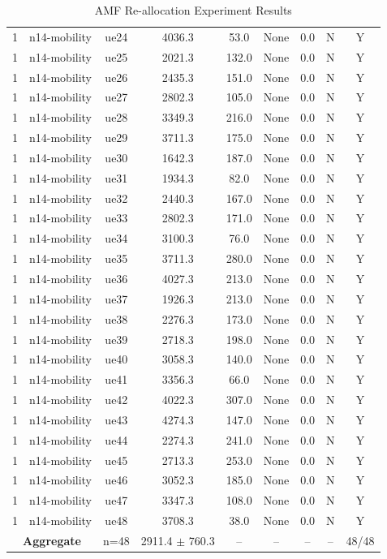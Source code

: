 \begin{table}[ht]
\begin{tabular}{|c|c|c|c|c|c|c|c|c|}
1 & n14-mobility & ue24 & 4036.3 & 53.0 & None & 0.0 & N & Y \\
1 & n14-mobility & ue25 & 2021.3 & 132.0 & None & 0.0 & N & Y \\
1 & n14-mobility & ue26 & 2435.3 & 151.0 & None & 0.0 & N & Y \\
1 & n14-mobility & ue27 & 2802.3 & 105.0 & None & 0.0 & N & Y \\
1 & n14-mobility & ue28 & 3349.3 & 216.0 & None & 0.0 & N & Y \\
1 & n14-mobility & ue29 & 3711.3 & 175.0 & None & 0.0 & N & Y \\
1 & n14-mobility & ue30 & 1642.3 & 187.0 & None & 0.0 & N & Y \\
1 & n14-mobility & ue31 & 1934.3 & 82.0 & None & 0.0 & N & Y \\
1 & n14-mobility & ue32 & 2440.3 & 167.0 & None & 0.0 & N & Y \\
1 & n14-mobility & ue33 & 2802.3 & 171.0 & None & 0.0 & N & Y \\
1 & n14-mobility & ue34 & 3100.3 & 76.0 & None & 0.0 & N & Y \\
1 & n14-mobility & ue35 & 3711.3 & 280.0 & None & 0.0 & N & Y \\
1 & n14-mobility & ue36 & 4027.3 & 213.0 & None & 0.0 & N & Y \\
1 & n14-mobility & ue37 & 1926.3 & 213.0 & None & 0.0 & N & Y \\
1 & n14-mobility & ue38 & 2276.3 & 173.0 & None & 0.0 & N & Y \\
1 & n14-mobility & ue39 & 2718.3 & 198.0 & None & 0.0 & N & Y \\
1 & n14-mobility & ue40 & 3058.3 & 140.0 & None & 0.0 & N & Y \\
1 & n14-mobility & ue41 & 3356.3 & 66.0 & None & 0.0 & N & Y \\
1 & n14-mobility & ue42 & 4022.3 & 307.0 & None & 0.0 & N & Y \\
1 & n14-mobility & ue43 & 4274.3 & 147.0 & None & 0.0 & N & Y \\
1 & n14-mobility & ue44 & 2274.3 & 241.0 & None & 0.0 & N & Y \\
1 & n14-mobility & ue45 & 2713.3 & 253.0 & None & 0.0 & N & Y \\
1 & n14-mobility & ue46 & 3052.3 & 185.0 & None & 0.0 & N & Y \\
1 & n14-mobility & ue47 & 3347.3 & 108.0 & None & 0.0 & N & Y \\
1 & n14-mobility & ue48 & 3708.3 & 38.0 & None & 0.0 & N & Y \\
\multicolumn{2}{|c|}{\textbf{Aggregate}} & n=48 & 2911.4 $\pm$ 760.3 & -- & -- & -- & -- & 48/48 \\
\hline
\end{tabular}
\caption{AMF Re-allocation Experiment Results}
\label{tab:amf_realloc}
\end{table}
